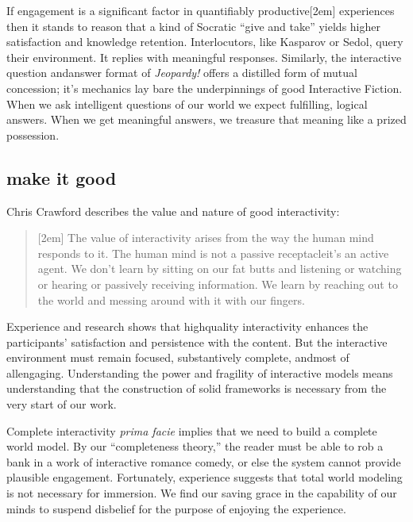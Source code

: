 If engagement is a significant factor in 
quantifiably productive[2em] experiences then it stands to reason that a kind of Socratic ``give and take'' yields higher satisfaction and knowledge retention.
Interlocutors, like Kasparov or Sedol, query their environment. It replies with
meaningful responses. Similarly, the interactive question\textendash
and\textendash answer format of \textit{Jeopardy!} offers a distilled form of
mutual concession; it's mechanics lay bare the underpinnings of good Interactive
Fiction. When we ask intelligent questions of our world we expect fulfilling,
logical answers. When we get meaningful answers, we treasure that meaning like a prized possession.

\subsection{make it good}
\noindent Chris Crawford describes the value and nature of good
interactivity:
\begin{quote}
[2em]
The value of interactivity arises from the way the human mind responds to it.
The human mind is not a passive receptacle\textemdash it's an active agent. We don't learn
by sitting on our fat butts and listening or watching or hearing or passively
receiving information. We learn by reaching out to the world and messing around
with it with our fingers.
\end{quote}

\noindent Experience and research shows that high\textendash quality interactivity enhances the participants' satisfaction and
persistence with the content. 
But the interactive environment must remain focused, substantively complete, and\textemdash most of
all\textemdash engaging. Understanding the power and fragility of interactive models
means understanding that the construction of solid frameworks is necessary from
the very start of our work.

Complete interactivity \textit{prima facie} implies that we need to
build a complete world model. By our ``completeness theory,'' the reader must be
able to rob a bank in a work of interactive
romance comedy, or else the system cannot provide plausible engagement.
Fortunately, experience  
suggests that total world modeling is not necessary for immersion. We find our
saving grace in the capability of our minds to suspend disbelief for the purpose
of enjoying the experience. 

